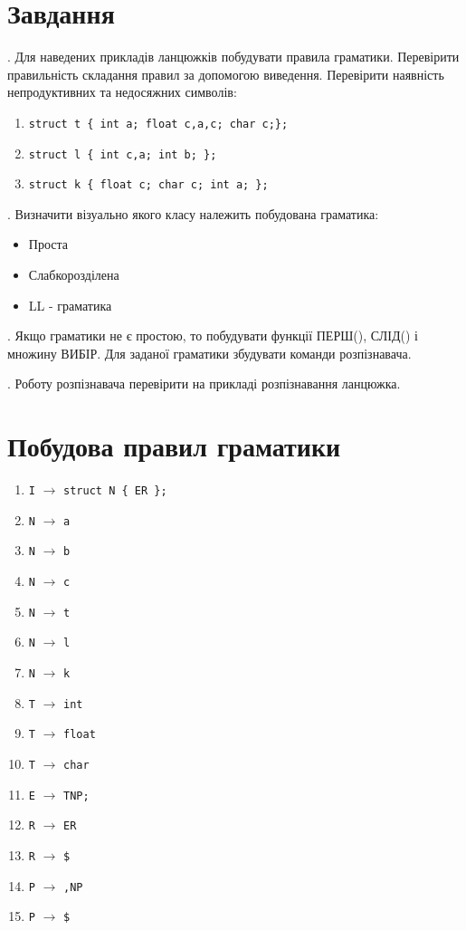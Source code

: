\section{Завдання}
. Для наведених прикладів ланцюжків побудувати правила граматики.
Перевірити правильність складання правил за допомогою виведення.
Перевірити наявність непродуктивних та недосяжних символів:

\begin{enumerate}
    \item \verb|struct t { int a; float c,a,c; char c;};|
    \item \verb|struct l { int c,a; int b; };|
    \item \verb|struct k { float c; char c; int a; };|
\end{enumerate}

. Визначити візуально якого класу належить побудована граматика:
\begin{itemize}
    \item Проста
    \item Слабкорозділена
    \item LL - граматика
\end{itemize}

. Якщо граматики не є простою, то побудувати функції ПЕРШ(), СЛІД()
і множину ВИБІР. Для заданої граматики збудувати команди розпізнавача.

. Роботу розпізнавача перевірити на прикладі розпізнавання ланцюжка.


\newpage
\section{Побудова правил граматики}
\begin{enumerate}
    \item  \verb|I| $\to$ \verb|struct N { ER };|
    \item  \verb|N| $\to$ \verb|a|
    \item  \verb|N| $\to$ \verb|b|
    \item  \verb|N| $\to$ \verb|c|
    \item  \verb|N| $\to$ \verb|t|
    \item  \verb|N| $\to$ \verb|l|
    \item  \verb|N| $\to$ \verb|k|
    \item  \verb|T| $\to$ \verb|int|
    \item  \verb|T| $\to$ \verb|float|
    \item  \verb|T| $\to$ \verb|char|
    \item  \verb|E| $\to$ \verb|TNP;|
    \item  \verb|R| $\to$ \verb|ER|
    \item  \verb|R| $\to$ \verb|$|
    \item  \verb|P| $\to$ \verb|,NP|
    \item  \verb|P| $\to$ \verb|$|
\end{enumerate}


